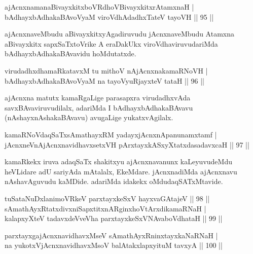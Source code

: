\begin{shl}
ajAcnxnamanaBivayxkitxboVRdhoV\s BivayxkitxrAtamxnaH |\\
bAdhayxbAdhakaBAvoV\s yaM viroVdhAdadhxTateV tayoVH \hfill || 95 ||
\end{shl}

\begin{artha}
ajAcnxnaveMbudu aBivayxkitxyAgadiruvudu jAcnxnaveMbudu Atamxna aBivayxkitx sapxSaTxtoVrike A eraDakUkx viroVdhaviruvudariMda bAdhayxbAdhakaBAvavidu hoMdutatxde.
\end{artha}

\begin{shl}
virudadhxdhamaRkatavxM tu mithoV nAjAcnxnakamaRNoVH |\\
bAdhayxbAdhakaBAvoV\s yaM na tayoVyuRjayxteV tataH \hfill || 96 ||
\end{shl}

\begin{artha}
ajAcnxna matutx kamaRgaLige parasapxra virudadhxvAda savxBAvaviruvudilalx, adariMda I bAdhayxbAdhakaBAvavu (nAshayxnAshakaBAvavu) avugaLige yukatxvAgilalx.
\end{artha}

\begin{shl}
kamaRNoV\s daqSaTxsAmathayxRM yadayxjAcnxnApanunamxtamf |\\
jAcnxneVnAjAcnxnavidhavxsetxVH pArxtayxkASxyXtatxdasadavxcaH \hfill || 97 ||
\end{shl}

\begin{artha}
kamaRkekx iruva adaqSaTx shakitxyu ajAcnxnavanunx kaLeyuvudeMdu heVLidare adU sariyAda mAtalalx, EkeMdare. jAcnxnadiMda ajAcnxnavu nAshavAguvudu kaMDide. adariMda idakekx oMdudaqSATxMtavide.
\end{artha}

\begin{shl}
tuSataNuDxlanimoVRkeV parxtayxkeSxV hayxvaGAtajeV \hfill || 98 ||	\\
sAmathAyxRtatxdivxniSapxtitxnARginxhoVtArxdikamaRNaH |\\
kalapxyXteV tadavxdeVveVha parxtayxkeSxVNAvaboVdhataH \hfill || 99 ||
\end{shl}

\begin{shl}
parxtayxgajAcnxnavidhavxMseV sAmathAyxRninxtayxkaNaRNaH |\\
na yukotxV\s jAcnxnavidhavxMsoV balAtakxlapxyituM tavxyA \hfill || 100 ||
\end{shl}

